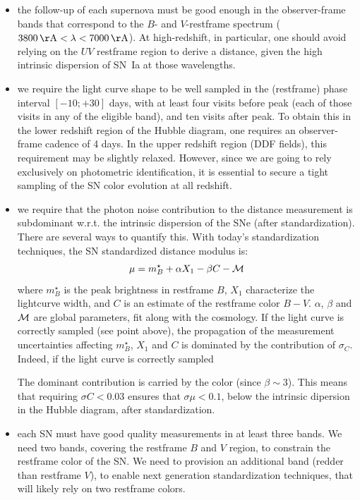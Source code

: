 \documentclass[\docopts]{\docclass}
\begin{document}
\begin{itemize}
\item the follow-up of each supernova must be good enough in the
  observer-frame bands that correspond to the $B$- and $V$-restframe
  spectrum ($3800 \angstrom < \lambda < 7000 \angstrom$).  At
  high-redshift, in particular, one should avoid relying on the $UV$
  restframe region to derive a distance, given the high intrinsic
  dispersion of SN~Ia at those wavelengths.
  
\item we require the light curve shape to be well sampled in the
  (restframe) phase interval $[-10;+30]$ days, with at least four
  visits before peak (each of those visits in any of the eligible
  band), and ten visits after peak.  To obtain this in the lower
  redshift region of the Hubble diagram, one requires an
  observer-frame cadence of 4 days.  In the upper redshift region (DDF
  fields), this requirement may be slightly relaxed. However, since we
  are going to rely exclusively on photometric identification, it is
  essential to secure a tight sampling of the SN color evolution at
  all redshift.
  
\item we require that the photon noise contribution to the distance
  measurement is subdominant w.r.t. the intrinsic dispersion of the
  SNe (after standardization).  There are several ways to quantify
  this.  With today's standardization techniques, the SN standardized
  distance modulus is:
  \begin{equation}
    \mu = m^\star_B + \alpha X_1 - \beta C - \cal{M}
  \end{equation}
  where $m^\star_B$ is the peak brightness in restframe $B$, $X_1$
  characterize the lightcurve width, and $C$ is an estimate of the
  restframe color $B-V$. $\alpha$, $\beta$ and $\cal{M}$ are global
  parameters, fit along with the cosmology. If the light curve is
  correctly sampled (see point above), the propagation of the
  measurement uncertainties affecting $m^\star_B$, $X_1$ and $C$ is
  dominated by the contribution of $\sigma_C$. Indeed, if the light
  curve is correctly sampled
  
  The dominant contribution is carried by the color (since
  $\beta \sim 3$). This means that requiring $\sigma C < 0.03$ ensures
  that $\sigma \mu < 0.1$, below the intrinsic dipersion in the Hubble
  diagram, after standardization.

\item each SN must have good quality measurements in at least three
  bands. We need two bands, covering the restframe $B$ and $V$ region,
  to constrain the restframe color of the SN. We need to provision an
  additional band (redder than restframe $V$), to enable next
  generation standardization techniques, that will likely rely on two
  restframe colors.
\end{itemize}
\end{document}
